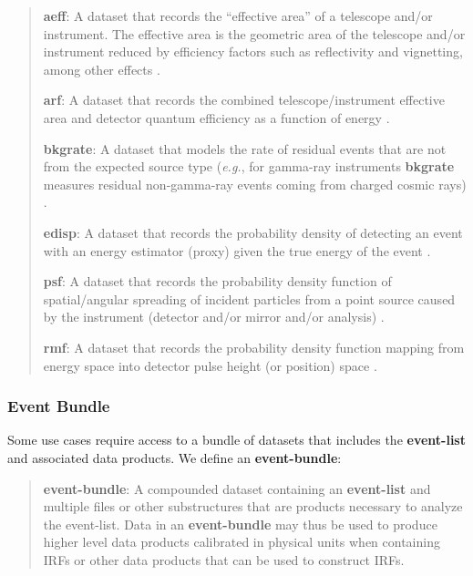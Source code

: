 \documentclass[11pt,a4paper]{ivoa}
\begin{document}
\begin{quote}
{\bf aeff}: A dataset that records the ``effective area'' of a telescope and/or instrument.  The effective area is the geometric area of the telescope and/or instrument reduced by efficiency factors such as reflectivity and vignetting, among other effects \citep{deil_2022_7304668}.

{\bf arf}: A dataset that records the combined telescope/instrument effective area and detector quantum efficiency as a function of energy \citep{ogip_spectrum_1998}.

{\bf bkgrate}: A dataset that models the rate of residual events that are not from the expected source type ({\em e.g.\/}, for gamma-ray instruments {\bf bkgrate} measures residual non-gamma-ray events coming from charged cosmic rays)  \citep{deil_2022_7304668}.

{\bf edisp}: A dataset that records the probability density of detecting an event with an energy estimator (proxy) given the true energy of the event \citep{deil_2022_7304668}.

{\bf psf}: A dataset that records the probability density function of spatial/angular spreading of incident particles from a point source caused by the instrument (detector and/or mirror and/or analysis) \citep{deil_2022_7304668, ogip_psf_2011}.

{\bf rmf}: A dataset that records the probability density function mapping from energy space into detector pulse height (or position) space \citep{ogip_spectrum_1998}.
\end{quote}

\subsubsection{Event Bundle}

Some use cases require access to a bundle of datasets that includes the {\bf event-list} and associated data products.  We define an {\bf event-bundle}:

\begin{quote}
{\bf event-bundle}: A compounded dataset containing an {\bf event-list} and multiple files or other substructures that are products necessary to analyze the event-list. Data in an {\bf event-bundle} may thus be used to produce higher level data products calibrated in physical units when containing \glspl{IRF} or other data products that can be used to construct \glspl{IRF}.
\end{quote}
\end{document}
